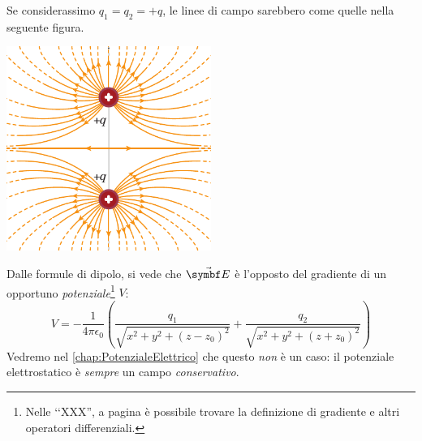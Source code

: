 Se considerassimo $q_1=q_2=+q$, le linee di campo sarebbero come quelle nella seguente figura.
\begin{center}
	\includegraphics[width=0.5\textwidth]{images/chp1/chp1campodipolo2.pdf}
\end{center}
\begin{observe}
	Dalle formule di dipolo, si vede che $\vba{E}$ è l'opposto del gradiente di un opportuno \textit{potenziale}\footnote{Nelle ‘‘XXX'', a pagina \pageref{gradiente} è possibile trovare la definizione di gradiente e altri operatori differenziali.} $V$:
	\begin{equation}
		V=-\frac{1}{4\pi\epsilon_0}\left(\frac{q_1}{\sqrt{x^2+y^2+(z-z_0)^2}}+\frac{q_2}{\sqrt{x^2+y^2+(z+z_0)^2}}\right)
	\end{equation}
Vedremo nel \autoref{chap:PotenzialeElettrico} che questo \textit{non} è un caso: il potenziale elettrostatico è \textit{sempre} un campo \textit{conservativo}.
\end{observe}
